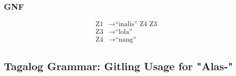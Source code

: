 \subsubsection{GNF}
\begin{equation*}
    \begin{aligned}
        \text{Z1}   & \rightarrow \text{“inalis” Z4 Z3}   \\
        \text{Z3} & \rightarrow \text{“lola”} \\
        \text{Z4} & \rightarrow \text{“nang”}
    \end{aligned}
\end{equation*}

\newpage
\subsection{Tagalog Grammar: Gitling Usage for "Alas-"}
